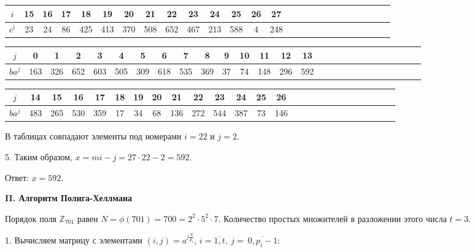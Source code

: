 \documentclass[a4paper,11pt,openany]{book}
\begin{document}
\medskip

{\centering
\begin{tabular}{||c|c|c|c|c|c|c|c|c|c|c|c|c|c|c|c|c|c|c|c|c|c|c|c|c|c||}
\hline
$i$ & 15 & 16 & 17 & 18 & 19 & 20 & 21 & 22 & 23 & 24 & 25 & 26 & 27 \\
\hline
$c^i$ & 23 & 24 & 86 & 425 & 413 & 370 & 508 & 652 & 467 & 213 & 588 & 4 & 248 \\
\hline
\end{tabular}

}

\medskip

{\centering
\begin{tabular}{||c|c|c|c|c|c|c|c|c|c|c|c|c|c|c|c|c|c|c|c|c|c|c|c|c|c|c||}
\hline
$j$ & 0 & 1 & 2 & 3 & 4 & 5 & 6 & 7 & 8 & 9 & 10 & 11 & 12 & 13 \\
\hline
$ba^j$ & 163 & 326 & 652 & 603 & 505 & 309 & 618 & 535 & 369 & 37 & 74 & 148 & 296 & 592 \\
\hline
\end{tabular}

}

\medskip

{\centering
\begin{tabular}{||c|c|c|c|c|c|c|c|c|c|c|c|c|c|c|c|c|c|c|c|c|c|c|c|c|c||}
\hline
$j$ & 14 & 15 & 16 & 17 & 18 & 19 & 20 & 21 & 22 & 23 & 24 & 25 & 26 \\
\hline
$ba^j$ & 483 & 265 & 530 & 359 & 17 & 34 & 68 & 136 & 272 & 544 & 387 & 73 & 146 \\
\hline
\end{tabular}

}

\medskip

\noindent В таблицах совпадают элементы под номерами $i = 22$ и $j = 2.$

5. Таким образом, $x = mi - j = 27 \cdot 22 - 2 = 592.$ 

\noindent Ответ: $x = 592$.

\newpage

\noindent \textbf{II. Алгоритм Полига-Хеллмана}

Порядок поля $\mathbb{Z}_{701}$ равен $N = \phi(701) = 700 = 2 ^ 2 \cdot 5 ^ 2 \cdot 7$. Количество простых множителей в разложении этого числа $t = 3$.

1. Вычисляем матрицу с элементами $(i, j) = a ^ { j  \frac{N}{p_i}} $, $i = \overline{1, t},\ j =~\overline{0, p_i - 1}$:

\medskip
\end{document}
